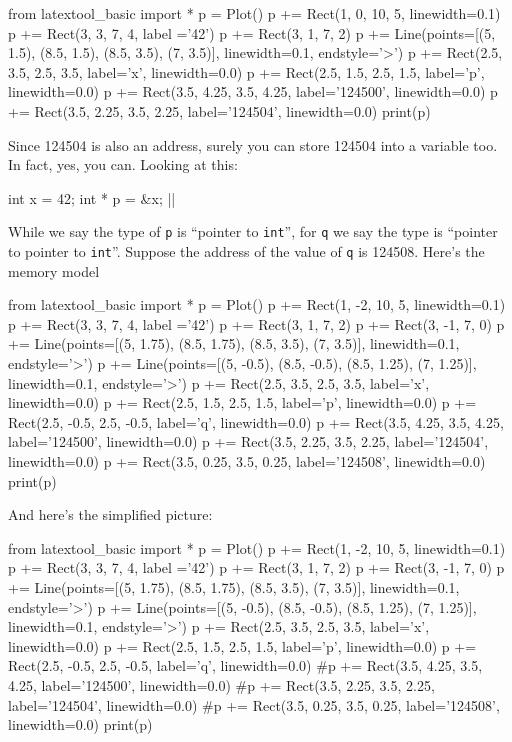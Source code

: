 \begin{python}
from latextool_basic import *
p = Plot()
p += Rect(1, 0, 10, 5, linewidth=0.1)
p += Rect(3, 3, 7, 4, label ='42')
p += Rect(3, 1, 7, 2)
p += Line(points=[(5, 1.5), (8.5, 1.5), (8.5, 3.5), (7, 3.5)], linewidth=0.1, endstyle='>')
p += Rect(2.5, 3.5, 2.5, 3.5, label='x', linewidth=0.0)
p += Rect(2.5, 1.5, 2.5, 1.5, label='p', linewidth=0.0)
p += Rect(3.5, 4.25, 3.5, 4.25, label='124500', linewidth=0.0)
p += Rect(3.5, 2.25, 3.5, 2.25, label='124504', linewidth=0.0)
print(p)
\end{python}

Since 124504 is also an address, surely you can store 124504 into a variable too. In fact, yes, you can. Looking at this:

\begin{consolethree}[escapeinside=||]
int x = 42;
int * p = &x;
||
\end{consolethree}
While we say the type of \texttt{p} is ``pointer to \texttt{int}'', for \texttt{q} we say the type is ``pointer to pointer to \texttt{int}''. Suppose the address of the value of \texttt{q} is 124508. Here's the memory model

\begin{python}
from latextool_basic import *
p = Plot()
p += Rect(1, -2, 10, 5, linewidth=0.1)
p += Rect(3, 3, 7, 4, label ='42')
p += Rect(3, 1, 7, 2)
p += Rect(3, -1, 7, 0)
p += Line(points=[(5, 1.75), (8.5, 1.75), (8.5, 3.5), (7, 3.5)], linewidth=0.1, endstyle='>')
p += Line(points=[(5, -0.5), (8.5, -0.5), (8.5, 1.25), (7, 1.25)], linewidth=0.1, endstyle='>')
p += Rect(2.5, 3.5, 2.5, 3.5, label='x', linewidth=0.0)
p += Rect(2.5, 1.5, 2.5, 1.5, label='p', linewidth=0.0)
p += Rect(2.5, -0.5, 2.5, -0.5, label='q', linewidth=0.0)
p += Rect(3.5, 4.25, 3.5, 4.25, label='124500', linewidth=0.0)
p += Rect(3.5, 2.25, 3.5, 2.25, label='124504', linewidth=0.0)
p += Rect(3.5, 0.25, 3.5, 0.25, label='124508', linewidth=0.0)
print(p)
\end{python}

And here's the simplified picture:
\begin{python}
from latextool_basic import *
p = Plot()
p += Rect(1, -2, 10, 5, linewidth=0.1)
p += Rect(3, 3, 7, 4, label ='42')
p += Rect(3, 1, 7, 2)
p += Rect(3, -1, 7, 0)
p += Line(points=[(5, 1.75), (8.5, 1.75), (8.5, 3.5), (7, 3.5)], linewidth=0.1, endstyle='>')
p += Line(points=[(5, -0.5), (8.5, -0.5), (8.5, 1.25), (7, 1.25)], linewidth=0.1, endstyle='>')
p += Rect(2.5, 3.5, 2.5, 3.5, label='x', linewidth=0.0)
p += Rect(2.5, 1.5, 2.5, 1.5, label='p', linewidth=0.0)
p += Rect(2.5, -0.5, 2.5, -0.5, label='q', linewidth=0.0)
#p += Rect(3.5, 4.25, 3.5, 4.25, label='124500', linewidth=0.0)
#p += Rect(3.5, 2.25, 3.5, 2.25, label='124504', linewidth=0.0)
#p += Rect(3.5, 0.25, 3.5, 0.25, label='124508', linewidth=0.0)
print(p)
\end{python}

